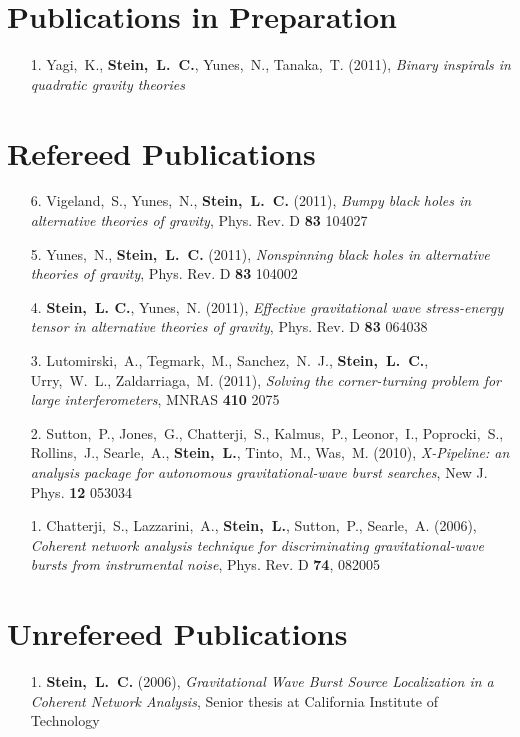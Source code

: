 \documentclass[margin,line]{res}
\begin{document}
\begin{resume}
\section{\sc Publications in Preparation}
\begin{enumerate}
\item[{1.}] Yagi,~K., {\bf Stein,~L.~C.}, Yunes,~N.,
  Tanaka,~T. (2011), {\it Binary inspirals in quadratic gravity theories}
\end{enumerate}

\section{\sc Refereed Publications}
\begin{enumerate}
\item[{6.}] Vigeland,~S., Yunes,~N., {\bf Stein,~L.~C.} (2011), {\it
    Bumpy black holes in alternative theories of gravity},
  Phys. Rev. D {\bf 83} 104027
\item[{5.}] Yunes,~N., {\bf Stein,~L.~C.} (2011), {\it Nonspinning
    black holes in alternative theories of gravity},
  Phys. Rev. D {\bf 83} 104002
\item[{4.}] {\bf Stein,~L. C.}, Yunes,~N. (2011), {\it Effective
    gravitational wave stress-energy tensor in alternative theories of
    gravity}, Phys. Rev. D {\bf 83} 064038
\item[{3.}] Lutomirski,~A., Tegmark,~M., Sanchez,~N.~J., {\bf
    Stein,~L.~C.},
  Urry,~W.~L., Zaldarriaga,~M. (2011), {\it Solving the
    corner-turning problem for large interferometers}, MNRAS {\bf 410} 2075
\item[{2.}] Sutton,~P., Jones,~G., Chatterji,~S., Kalmus,~P., Leonor,~I.,
  Poprocki,~S., Rollins,~J., Searle,~A., {\bf Stein,~L.}, Tinto,~M.,
  Was,~M. (2010), {\it X-Pipeline: an analysis package for autonomous
    gravitational-wave burst searches}, New J. Phys. {\bf 12} 053034
\item[{1.}] Chatterji,~S., Lazzarini,~A., {\bf Stein,~L.}, Sutton,~P.,
  Searle,~A. (2006), {\it Coherent network analysis technique for
    discriminating gravitational-wave bursts from instrumental noise},
  Phys. Rev. D {\bf 74}, 082005
\end{enumerate}

\section{\sc Unrefereed Publications}
\begin{enumerate}
\item[{1.}] {\bf Stein,~L.~C.} (2006), {\it Gravitational Wave Burst Source Localization in a Coherent Network Analysis}, Senior thesis at California Institute of Technology
\end{enumerate}


\end{resume}
\end{document}
